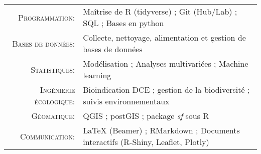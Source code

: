 \documentclass[localFont,alternative]{yaac-another-awesome-cv}
\begin{document}
\makecvheader

\renewcommand{\arraystretch}{1.1}

	\begin{tabular}{>{}r>{}p{13cm}} 
		\textsc{Programmation:}              &    Maîtrise de R (tidyverse) ; Git (Hub/Lab) ; SQL ; Bases en python\\ 
		\textsc{Bases de données:}               	&   Collecte, nettoyage, alimentation et gestion de bases de données \\ 
		\textsc{Statistiques:}  	 &   Modélisation ;  Analyses multivariées ; Machine learning \\
		\textsc{Ingénierie écologique:}              &    Bioindication DCE ; gestion de la biodiversité ; suivis environnementaux \\
		\textsc{Géomatique:}			&   QGIS ; postGIS ; package \textit{sf} sous R \\ 
		\textsc{Communication:}               	&   LaTeX (Beamer) ; RMarkdown ; Documents interactifs (R-Shiny, Leaflet, Plotly) 
	\end{tabular}
\end{document}
